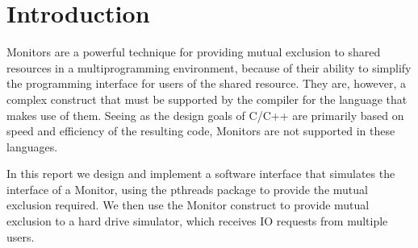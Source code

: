 \documentclass{report}
\begin{document}


\section{Introduction}
Monitors are a powerful technique for providing mutual exclusion to shared
resources in a multiprogramming environment, because of their ability to simplify the
programming interface for users of the shared resource. They are, however, a complex
construct that must be supported by the compiler for the language that makes use of them.
Seeing as the design goals of C/C++ are primarily based on speed and efficiency of the
resulting code, Monitors are not supported in these languages. 

In this report we design and implement a software interface that simulates the interface
of a Monitor, using the pthreads package to provide the mutual exclusion required. We then
use the Monitor construct to provide mutual exclusion to a hard drive simulator, which receives IO requests 
from multiple users.
\end{document}
